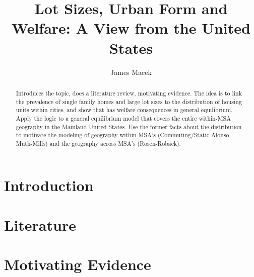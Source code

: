 \documentclass[]{article}
\title{Lot Sizes, Urban Form and Welfare: A View from the United States}
\author{James Macek}
\begin{document}
\maketitle

\begin{abstract}
Introduces the topic, does a literature review, motivating evidence. The idea is to link the prevalence of single family homes and large lot sizes to the distribution of housing units within cities, and show that has welfare consequences in general equilibrium. Apply the logic to a general equilibrium model that covers the entire within-MSA geography in the Mainland United States. Use the former facts about the distribution to motivate the modeling of geography within MSA's (Commuting/Static Alonso-Muth-Mills) and the geography across MSA's (Rosen-Roback). 
\end{abstract}

\section{Introduction}


\section{Literature}

\section{Motivating Evidence}
\end{document}
